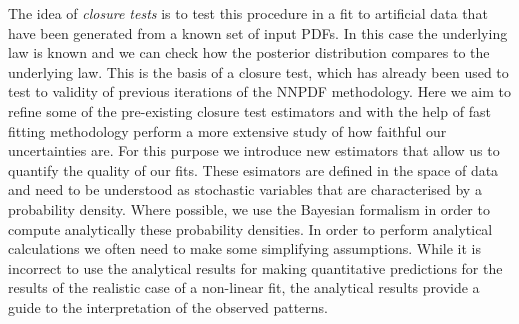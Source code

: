 The idea of {\em closure tests} is to test this procedure in a fit to artificial
data that have been generated from a known set of input PDFs. In this case the
underlying law is known and we can check how the posterior distribution compares
to the underlying law. This is the basis of a closure test, which has already
been used to test to validity of previous iterations of the NNPDF methodology.
Here we aim to refine some of the pre-existing closure test estimators and with
the help of fast fitting methodology perform a more extensive study of how
faithful our uncertainties are. For this purpose we introduce new estimators
that allow us to quantify the quality of our fits. These esimators are defined
in the space of data and need to be understood as stochastic variables that are
characterised by a probability density. Where possible, we use the Bayesian
formalism in order to compute analytically these probability densities. In order
to perform analytical calculations we often need to make some simplifying
assumptions. While it is incorrect to use the analytical results for making
quantitative predictions for the results of the realistic case of a non-linear
fit, the analytical results provide a guide to the interpretation of the
observed patterns. 
 
